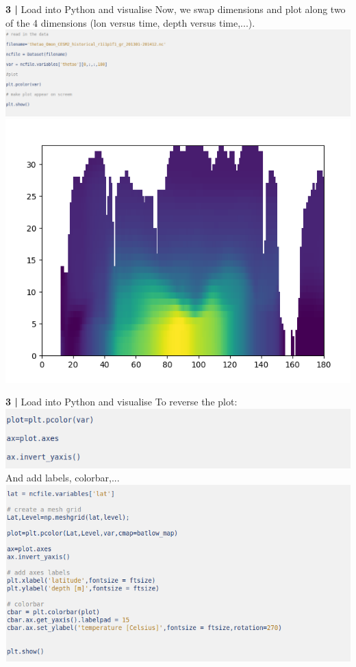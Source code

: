  
\begin{frame}{\textbf{3 |} Load into Python and visualise} 
    Now, we swap dimensions and plot along two of the 4 dimensions (lon versus time, depth versus time,...).\\
    \includegraphics[scale=0.35]{images/Script1_step9.png}
    \includegraphics[scale=0.25]{images/Script1_fig7.png}
\end{frame}
 
  
\begin{frame}{\textbf{3 |} Load into Python and visualise} 
    To reverse the plot:\\
    \includegraphics[scale=0.35]{images/Script1_step10.png}\\
    And add labels, colorbar,...
    \includegraphics[scale=0.35]{images/Script1_step11.png}
\end{frame}
 
